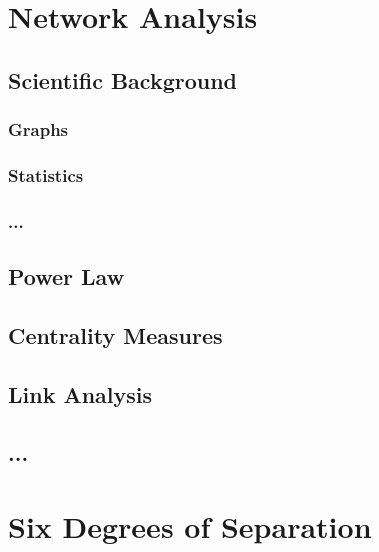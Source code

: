 \section{Network Analysis}
\subsection{Scientific Background}
\subsubsection{Graphs}
\subsubsection{Statistics}
\subsubsection{...}
\subsection{Power Law}
\subsection{Centrality Measures}
\subsection{Link Analysis}
\subsection{...}
\section{Six Degrees of Separation}
